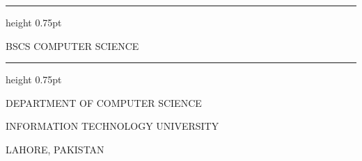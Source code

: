 \begin{titlepage}
  \thispagestyle{empty}
  \centering

  \vspace*{32pt}
  {\fontsize{16}{19.2}\selectfont \ReportTitle\par}

  \vspace{10.7pt}
  \hrule height 0.75pt

  \vspace{44.25pt}
  \TemplateLogo\par

  \vspace{33pt}
  {\fontsize{14}{16.8}\selectfont BSCS COMPUTER SCIENCE\par}

  \vspace{31pt}
  \TemplateStudentTable

  \vspace{122pt}
  \hrule height 0.75pt
  \vspace{30pt}

  {\fontsize{16}{27.6}\selectfont
    DEPARTMENT OF COMPUTER SCIENCE\par
    INFORMATION TECHNOLOGY UNIVERSITY\par
    LAHORE, PAKISTAN\par
  }
  \vspace*{14pt}
\end{titlepage}
